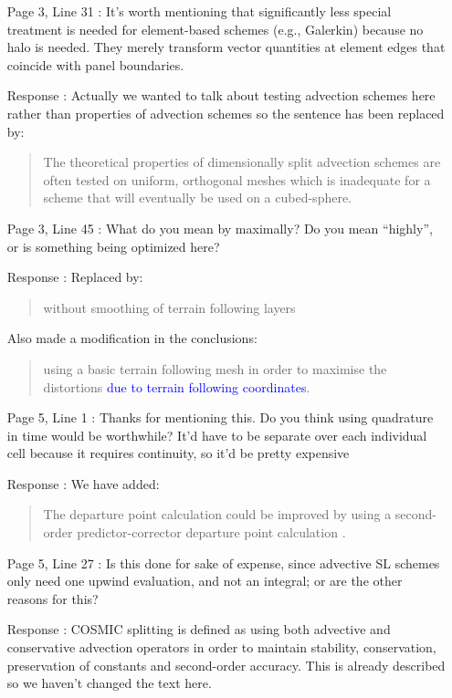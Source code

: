 \documentclass[12pt]{article}
\begin{document}
\begin{enumerate}
\item [Page 3, Line 31]: It's worth mentioning that significantly less special treatment is needed for element-based schemes (e.g., Galerkin) because no halo is needed. They merely transform vector quantities at element edges that coincide with panel boundaries.

\item [Response]: Actually we wanted to talk about testing advection schemes here rather than properties of advection schemes so the sentence has been replaced by:
\begin{quote}
The theoretical properties of dimensionally split advection schemes are often tested on uniform, orthogonal meshes \cite[eg][]{LLM96} which is inadequate for a scheme that will eventually be used on a cubed-sphere.
\end{quote}

\item [Page 3, Line 45]: What do you mean by maximally? Do you mean ``highly'', or is something being optimized here?

\item [Response]: Replaced by:
\begin{quote}
without smoothing of terrain following layers
\end{quote}
Also made a modification in the conclusions:
\begin{quote}
using a basic terrain following mesh in order to maximise the distortions \textcolor{blue}{due to terrain following coordinates}.
\end{quote}

\item [Page 5, Line 1]: Thanks for mentioning this. Do you think using quadrature in time would be worthwhile? It'd have to be separate over each individual cell because it requires continuity, so it'd be pretty expensive

\item [Response]: We have added:
\begin{quote}
The departure point calculation could be improved by using a second-order predictor-corrector departure point calculation \cite[eg][]{MDW+10}.
\end{quote}

\item [Page 5, Line 27]: Is this done for sake of expense, since advective SL schemes only need one upwind evaluation, and not an integral; or are the other reasons for this?

\item [Response]: COSMIC splitting is defined as using both advective and conservative advection operators in order to maintain stability, conservation, preservation of constants and second-order accuracy. This is already described so we haven't changed the text here.


\end{enumerate}
\end{document}
